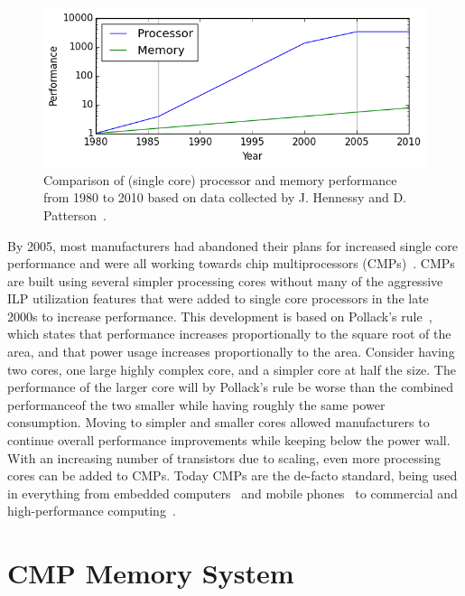 \begin{figure}[ht]
\centering
\includegraphics[width=.8\textwidth]{figures/introduction/memory-gap}
\caption[Processor-Memory Gap]{Comparison of (single core) processor and memory performance from 1980 to 2010 based on data collected by J. Hennessy and D. Patterson~\cite{hennessy2012}.}
\label{fig:introduction:memgap}
\end{figure}

By 2005, most manufacturers had abandoned their plans for increased single core performance and were all working towards chip multiprocessors (CMPs)~\cite{Sutter2005}.
CMPs are built using several simpler processing cores without many of the aggressive ILP utilization features that were added to single core processors in the late 2000s to increase performance.
This development is based on Pollack's rule~\cite{Borkar2007}, which states that performance increases proportionally to the square root of the area, and that power usage increases proportionally to the area.
Consider having two cores, one large highly complex core, and a simpler core at half the size.
The performance of the larger core will by Pollack's rule be worse than the combined performance\footnotemark of the two smaller while having roughly the same power consumption.
Moving to simpler and smaller cores allowed manufacturers to continue overall performance improvements while keeping below the power wall.
With an increasing number of transistors due to scaling, even more processing cores can be added to CMPs.
Today CMPs are the de-facto standard, being used in everything from embedded computers~\cite{ARM2010} and mobile phones~\cite{Ho2014} to commercial and high-performance computing~\cite{Thomadakis2011, Jain2013}.


\section{CMP Memory System}


